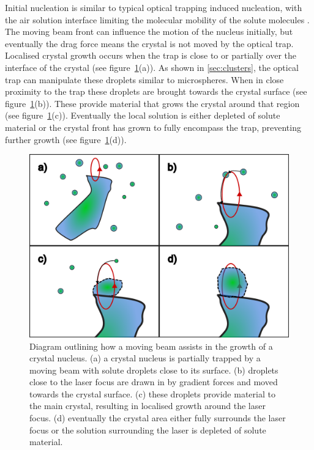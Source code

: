 Initial nucleation is similar to typical optical trapping induced nucleation,
with the air solution interface limiting the molecular mobility of the solute
molecules \cite{Liao2022, Sugiyama2009, Gowayed2021}. The moving beam front 
can influence the motion of the nucleus initially, but eventually the drag 
force means the crystal is not moved by the optical trap. Localised crystal
growth occurs when the trap is close to or partially over the interface of 
the crystal (see figure~\ref{fig:local_nucleation}(a)). As shown in \ref{sec:clusters}, the optical trap can manipulate these droplets similar 
to microspheres. When in close proximity to the trap these droplets are 
brought towards the crystal surface (see figure~\ref{fig:local_nucleation}(b)). 
These provide material that grows the crystal around that region (see figure~\ref{fig:local_nucleation}(c)). Eventually the local solution is either 
depleted of solute material or the crystal front has grown to fully encompass 
the trap, preventing further growth (see figure~\ref{fig:local_nucleation}(d)). 
\begin{figure}[h!]
	\centering
	\includegraphics[width=0.8\linewidth]{galvano_diagram.pdf}
	\caption{Diagram outlining how a moving beam assists in the growth of a crystal
		nucleus. (a) a crystal nucleus is partially trapped by a moving beam with 
		solute droplets close to its surface. (b) droplets close to the laser
		focus are drawn in by gradient forces and moved towards the crystal surface.
		(c) these droplets provide material to the main crystal, resulting in
		localised growth around the laser focus. (d) eventually the crystal area 
		either fully surrounds the laser focus or the solution surrounding the laser
		is depleted of solute material.}
	\label{fig:local_nucleation}
\end{figure}

